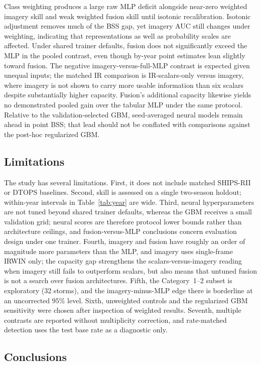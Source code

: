 \documentclass[11pt]{article}
\begin{document}
Class weighting produces a large raw MLP deficit alongside near-zero weighted imagery skill and weak weighted fusion skill until isotonic recalibration. Isotonic adjustment removes much of the BSS gap, yet imagery AUC still changes under weighting, indicating that representations as well as probability scales are affected. Under shared trainer defaults, fusion does not significantly exceed the MLP in the pooled contrast, even though by-year point estimates lean slightly toward fusion. The negative imagery-versus-full-MLP contrast is expected given unequal inputs; the matched IR comparison is IR-scalars-only versus imagery, where imagery is not shown to carry more usable information than six scalars despite substantially higher capacity. Fusion's additional capacity likewise yields no demonstrated pooled gain over the tabular MLP under the same protocol. Relative to the validation-selected GBM, seed-averaged neural models remain ahead in point BSS; that lead should not be conflated with comparisons against the post-hoc regularized GBM.

\subsection{Limitations}

The study has several limitations. First, it does not include matched SHIPS-RII or DTOPS baselines. Second, skill is assessed on a single two-season holdout; within-year intervals in Table~\ref{tab:year} are wide. Third, neural hyperparameters are not tuned beyond shared trainer defaults, whereas the GBM receives a small validation grid; neural scores are therefore protocol lower bounds rather than architecture ceilings, and fusion-versus-MLP conclusions concern evaluation design under one trainer. Fourth, imagery and fusion have roughly an order of magnitude more parameters than the MLP, and imagery uses single-frame IRWIN only; the capacity gap strengthens the scalars-versus-imagery reading when imagery still fails to outperform scalars, but also means that untuned fusion is not a search over fusion architectures. Fifth, the Category~1--2 subset is exploratory (32 storms), and the imagery-minus-MLP edge there is borderline at an uncorrected $95\%$ level. Sixth, unweighted controls and the regularized GBM sensitivity were chosen after inspection of weighted results. Seventh, multiple contrasts are reported without multiplicity correction, and rate-matched detection uses the test base rate as a diagnostic only.

\subsection{Conclusions}
\end{document}
